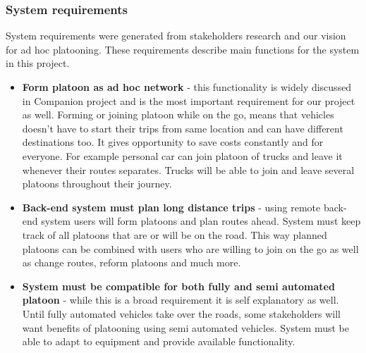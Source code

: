 \subsubsection{System requirements}
%
System requirements were generated from stakeholders research and our vision for ad hoc platooning. These requirements describe main functions for the system in this project.
%
\begin{itemize}
    \item\textbf{Form platoon as ad hoc network} - this functionality is widely discussed in Companion project and is the most important requirement for our project as well. Forming or joining platoon while on the go, means that vehicles doesn't have to start their trips from same location and can have different destinations too. It gives opportunity to save costs constantly and for everyone. For example personal car can join platoon of trucks and leave it whenever their routes separates. Trucks will be able to join and leave several platoons throughout their journey.
    \item\textbf{Back-end system must plan long distance trips} - using remote back-end system users will form platoons and plan routes ahead. System must keep track of all platoons that are or will be on the road. This way planned platoons can be combined with users who are willing to join on the go as well as change routes, reform platoons and much more.
    \item\textbf{System must be compatible for both fully and semi automated platoon} - while this is a broad requirement it is self explanatory as well. Until fully automated vehicles take over the roads, some stakeholders will want benefits of platooning using semi automated vehicles. System must be able to adapt to equipment and provide available functionality.
\end{itemize}
%
